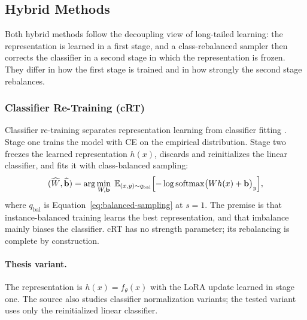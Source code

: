 \documentclass[11pt]{article}
\begin{document}
\subsection{Hybrid Methods}
Both hybrid methods follow the decoupling view of long-tailed learning: the representation is learned in a first stage, and a class-rebalanced sampler then corrects the classifier in a second stage in which the representation is frozen. They differ in how the first stage is trained and in how strongly the second stage rebalances.

\subsubsection{Classifier Re-Training (cRT)}
Classifier re-training separates representation learning from classifier fitting \citep{kang2020decouplingRepresentation}. Stage one trains the model with CE on the empirical distribution. Stage two freezes the learned representation $h(x)$, discards and reinitializes the linear classifier, and fits it with class-balanced sampling:
\begin{equation}
  (\widehat W,\widehat{\mathbf b})
  =\arg\min_{W,\mathbf b}\;
  \mathbb E_{(x,y)\sim q_{\mathrm{bal}}}
  \Bigl[-\log\operatorname{softmax}\bigl(W h(x)+\mathbf b\bigr)_y\Bigr],
  \label{eq:crt}
\end{equation}
\noindent where $q_{\mathrm{bal}}$ is Equation~\eqref{eq:balanced-sampling} at $s=1$. The premise is that instance-balanced training learns the best representation, and that imbalance mainly biases the classifier. cRT has no strength parameter; its rebalancing is complete by construction.

\paragraph{Thesis variant.}
The representation is $h(x)=f_\theta(x)$ with the LoRA update learned in stage one. The source also studies classifier normalization variants; the tested variant uses only the reinitialized linear classifier.
\end{document}
